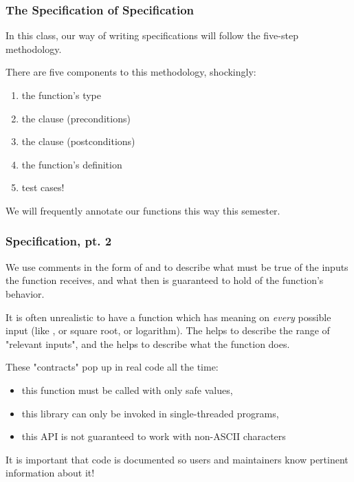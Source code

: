 \documentclass[aspectratio=169]{beamer}
\begin{document}
\begin{frame}[fragile]
  \frametitle{The Specification of Specification}

  In this class, our way of writing specifications will follow the 
  five-step methodology.

  \pause
  \vspace{\fill}

  There are five components to this methodology, shockingly:
  \pause
  \begin{enumerate}
    \item the function's type \pause
    \item the  clause (preconditions) \pause
    \item the  clause (postconditions) \pause
    \item the function's definition \pause
    \item test cases! \pause
  \end{enumerate}

  \vspace{\fill}

  We will frequently annotate our functions this way this semester.
\end{frame}

\begin{frame}[fragile]
  \frametitle{Specification, pt. 2}

  We use comments in the form of  and  to describe 
  what must be true of the inputs the function receives, and what then is guaranteed 
  to hold of the function's behavior. 

  \pause
  \vspace{\fill}

  It is often unrealistic to have a function which has meaning on \textit{every} possible 
  input (like , or square root, or logarithm). The  helps to
  describe the range of "relevant inputs", and the  helps to describe
  what the function does.

  \pause
  \vspace{\fill}

  These "contracts" pop up in real code all the time:
  \pause
  \begin{itemize}
    \item this function must be called with only safe values, \pause
    \item this library can only be invoked in single-threaded programs, \pause
    \item this API is not guaranteed to work with non-ASCII characters \pause 
  \end{itemize}

  \vspace{\fill}

  It is important that code is documented so users and maintainers know pertinent
  information about it! 
\end{frame}
\end{document}
